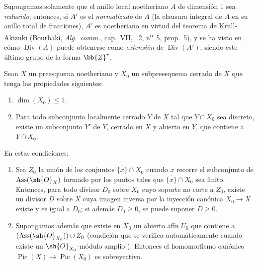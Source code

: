 \begin{env}[21.9.10]
\label{IV.21.9.10}
Supongamos solamente que el anillo local noetheriano $A$ de dimensión $1$ sea \emph{reducido};
entonces, si $A'$ es el \emph{normalizado} de $A$ (la clausura integral de $A$ en su anillo total de fracciones), $A'$ es noetheriano en virtud del teorema de Krull-Akizuki (Bourbaki, \emph{Alg.\ comm.}, cap.~VII, \textsection~2, n\textsuperscript{o}~5, prop.~5), y se ha visto en  cómo
$\operatorname{Div}(A)$ puede obtenerse como \emph{extensión} de $\operatorname{Div}(A')$, siendo este último grupo de la forma $\bb{Z}^r$.
\end{env}

\begin{proposition}[21.9.11]
\label{IV.21.9.11}
Sean $X$ un preesquema noetheriano y $X_0$ un subpreesquema cerrado de $X$ que tenga las propiedades siguientes:
\begin{enumerate}
  \item[\rm 1\textsuperscript{o}] $\dim(X_0)\leq1$.
  \item[\rm 2\textsuperscript{o}] Para todo subconjunto localmente cerrado $Y$ de $X$ tal que $Y\cap X_0$ sea discreto, existe un subconjunto $Y'$ de $Y$, cerrado en $X$ y abierto en $Y$, que contiene a $Y\cap X_0$.
\end{enumerate}
En estas condiciones:
\begin{enumerate}[label=\textup{(\roman*)}]
  \item Sea $Z_0$ la unión de los conjuntos $\overline{\{x\}}\cap X_0$ cuando $x$ recorre el subconjunto de $\operatorname{Ass}(\sh{O}_X)$ formado por los puntos tales que $\overline{\{x\}}\cap X_0$ sea finito.
Entonces, para todo divisor $D_0$ sobre $X_0$ cuyo soporte no corte a $Z_0$, existe un divisor $D$ sobre $X$ cuya imagen inversa por la inyección canónica $X_0\to X$ existe  y es igual a $D_0$;
si además $D_0\geq0$, se puede suponer $D\geq0$.

  \item Supongamos además que existe en $X_0$ un abierto afín $U_0$ que contiene a $(\operatorname{Ass}(\sh{O}_{X_0}))\cup Z_0$ \textup{(}condición que se verifica automáticamente cuando existe un $\sh{O}_{X_0}$-módulo amplio \textup{)}.
Entonces el homomorfismo canónico  $\operatorname{Pic}(X)\to\operatorname{Pic}(X_0)$ es sobreyectivo.
\end{enumerate}
\end{proposition}

